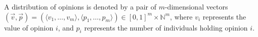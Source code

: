 \documentclass[preview]{standalone}
\begin{document}
\begin{center}
A distribution of opinions is denoted by a pair of $m$-dimensional vectors $(\vec{v},\vec{p}) = (\langle v_1,\ldots,v_m \rangle,\langle p_1,\ldots,p_m \rangle) \in [0,1]^m \times \mathbb{N}^m$, where $v_i$ represents the value of opinion $i$, and $p_i$ represents the number of individuals holding opinion $i$.
\end{center}
\end{document}
